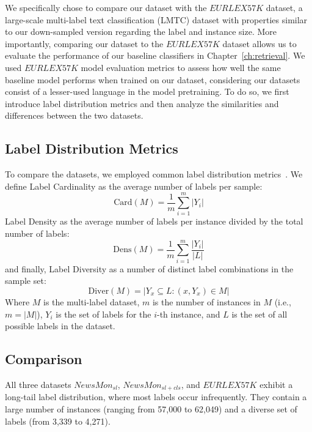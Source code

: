 We specifically chose to compare our dataset with the $EURLEX57K$ dataset, a large-scale multi-label text classification (LMTC) dataset with properties similar to our down-sampled version regarding the label and instance size.
More importantly, comparing our dataset to the $EURLEX57K$ dataset allows us to evaluate the performance of our baseline classifiers in Chapter~\ref{ch:retrieval}.
We used $EURLEX57K$ model evaluation metrics to assess how well the same baseline model performs when trained on our dataset, considering our datasets consist of a lesser-used language in the model pretraining.
To do so, we first introduce label distribution metrics and then analyze the similarities and differences between the two datasets.

\subsection{Label Distribution Metrics}
To compare the datasets, we employed common label distribution metrics~\parencite{TAREKEGN2021107965, Bernardini2014CardinalityAD}.
We define Label Cardinality as the average number of labels per sample:
\begin{equation}
\text{Card}(M) = \frac{1}{m} \sum_{i=1}^{m} |Y_i|
\end{equation}
Label Density as the average number of labels per instance divided by the total number of  labels:
\begin{equation}
\text{Dens}(M) = \frac{1}{m} \sum_{i=1}^{m} \frac{|Y_i|}{|L|}
\end{equation}
and finally, Label Diversity as a number of distinct label combinations in the sample set:
\begin{equation}
\text{Diver}(M) = |{Y_x \subseteq L: (x, Y_x) \in M}|
\end{equation}
Where $M$ is the multi-label dataset, $m$ is the number of instances in $M$ (i.e., $m = |M|$), $Y_i$ is the set of labels for the $i$-th instance, and $L$ is the set of all possible labels in the dataset.

\subsection{Comparison}

All three datasets $NewsMon_{sl}$, $NewsMon_{sl+cls}$, and $EURLEX57K$ exhibit a long-tail label distribution, where most labels occur infrequently. 
They contain a large number of instances (ranging from 57,000 to 62,049) and a diverse set of labels (from 3,339 to 4,271).

